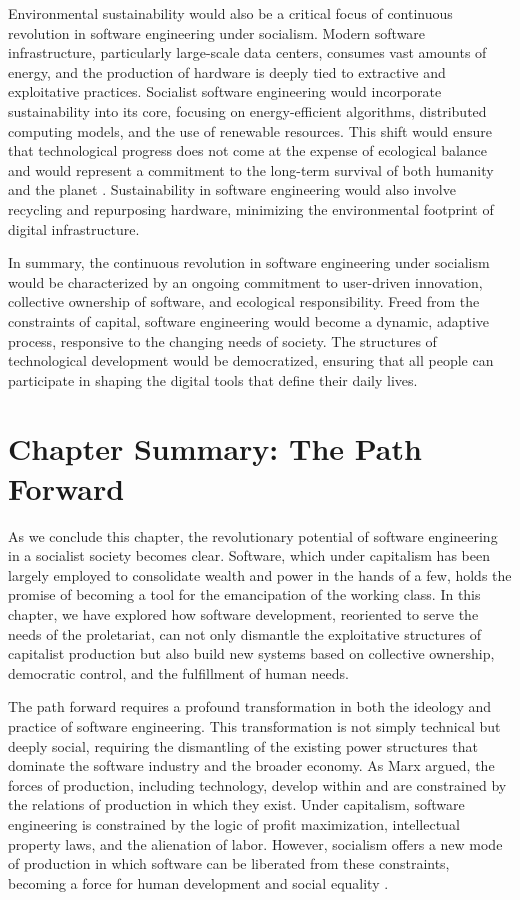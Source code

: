 \begin{refsection}
Environmental sustainability would also be a critical focus of continuous revolution in software engineering under socialism. Modern software infrastructure, particularly large-scale data centers, consumes vast amounts of energy, and the production of hardware is deeply tied to extractive and exploitative practices. Socialist software engineering would incorporate sustainability into its core, focusing on energy-efficient algorithms, distributed computing models, and the use of renewable resources. This shift would ensure that technological progress does not come at the expense of ecological balance and would represent a commitment to the long-term survival of both humanity and the planet \cite[pp.~119-122]{schwab2020}. Sustainability in software engineering would also involve recycling and repurposing hardware, minimizing the environmental footprint of digital infrastructure.

In summary, the continuous revolution in software engineering under socialism would be characterized by an ongoing commitment to user-driven innovation, collective ownership of software, and ecological responsibility. Freed from the constraints of capital, software engineering would become a dynamic, adaptive process, responsive to the changing needs of society. The structures of technological development would be democratized, ensuring that all people can participate in shaping the digital tools that define their daily lives.

\section{Chapter Summary: The Path Forward}

As we conclude this chapter, the revolutionary potential of software engineering in a socialist society becomes clear. Software, which under capitalism has been largely employed to consolidate wealth and power in the hands of a few, holds the promise of becoming a tool for the emancipation of the working class. In this chapter, we have explored how software development, reoriented to serve the needs of the proletariat, can not only dismantle the exploitative structures of capitalist production but also build new systems based on collective ownership, democratic control, and the fulfillment of human needs.

The path forward requires a profound transformation in both the ideology and practice of software engineering. This transformation is not simply technical but deeply social, requiring the dismantling of the existing power structures that dominate the software industry and the broader economy. As Marx argued, the forces of production, including technology, develop within and are constrained by the relations of production in which they exist. Under capitalism, software engineering is constrained by the logic of profit maximization, intellectual property laws, and the alienation of labor. However, socialism offers a new mode of production in which software can be liberated from these constraints, becoming a force for human development and social equality \cite[pp.~376-377]{marx1867}.


\end{refsection}
